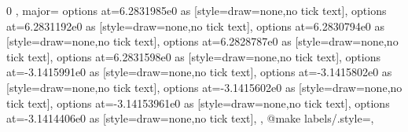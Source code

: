 {{{{{            $0$%
          \else%
            \ifdim\pgfmathresult pt=1.0pt%
              $\pi$%
            \else
              \pgfmathapproxequalto{\tikz@lib@dv@pol}{-1}%
              \ifdim\pgfmathresult pt=1.0pt%
                $-\pi$%
              \else%
                \pgfmathprintnumber{\tikz@lib@dv@pol}$\pi$%
              \fi%
            \fi%
          \fi%
        },
        major={
          options at=6.2831985e0 as [{style={draw=none},no tick text}],
          options at=6.2831192e0 as [{style={draw=none},no tick text}],   
          options at=6.2830794e0 as [{style={draw=none},no tick text}],   
          options at=6.2828787e0 as [{style={draw=none},no tick text}],   
          options at=6.2831598e0 as [{style={draw=none},no tick text}],   
          options at=-3.1415991e0 as [{style={draw=none},no tick text}],
          options at=-3.1415802e0 as [{style={draw=none},no tick text}],
          options at=-3.1415602e0 as [{style={draw=none},no tick text}],
          options at=-3.14153961e0 as [{style={draw=none},no tick text}],
          options at=-3.1414406e0 as [{style={draw=none},no tick text}],
        } 
      }
    }
  },
  @make labels/.style={},
}

